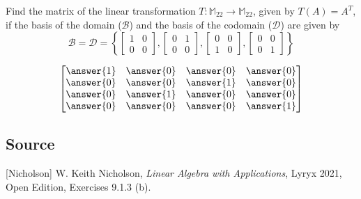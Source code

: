 \documentclass{ximera}
\author{}
\begin{document}
\begin{exercise}
Find the matrix of the linear transformation $T:\mathbb{M}_{22}\rightarrow \mathbb{M}_{22}$, given by $T(A)=A^T$, if the basis of the domain ($\mathcal{B}$) and the basis of the codomain ($\mathcal{D}$) are given by
$$\mathcal{B}=\mathcal{D}=\left\{\begin{bmatrix}1 & 0\\0 & 0\end{bmatrix},\begin{bmatrix}0 & 1\\0 & 0\end{bmatrix}, \begin{bmatrix}0 & 0\\1 & 0\end{bmatrix}, \begin{bmatrix}0 & 0\\0 & 1\end{bmatrix}\right\} $$

$$\begin{bmatrix}\answer{1} & \answer{0} & \answer{0} & \answer{0}\\\answer{0} & \answer{0} & \answer{1} & \answer{0}\\\answer{0} & \answer{1} & \answer{0} & \answer{0}\\\answer{0} & \answer{0} & \answer{0} & \answer{1}\end{bmatrix}$$
 \end{exercise}

\subsection*{Source}
[Nicholson] W. Keith Nicholson, {\it Linear Algebra with Applications}, Lyryx 2021, Open Edition, Exercises 9.1.3 (b).  
\end{document}
